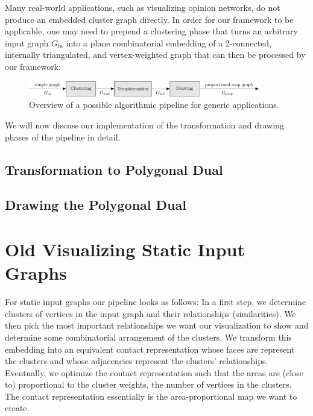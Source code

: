 Many real-world applications, such as visualizing opinion networks, do not produce an embedded cluster graph directly. In order for our framework to be applicable, one may need to prepend a clustering phase that turns an arbitrary input graph $G_\text{in}$ into a plane combinatorial embedding of a 2-connected, internally triangulated, and vertex-weighted graph that can then be processed by our framework:
%
\begin{figure}[H]
	\centering\includegraphics[width=0.9\textwidth]{Resources/StaticPipeline-Augmented.pdf}
	\caption{Overview of a possible algorithmic pipeline for generic applications.}
	\label{fig:static-pipeline-augmented}
\end{figure}

We will now discuss our implementation of the transformation and drawing phases of the pipeline in detail.

\clearpage
\section{Transformation to Polygonal Dual}
\label{sect:transformation-to-polygonal-dual}
\clearpage
\section{Drawing the Polygonal Dual}
\label{sect:drawing-the-polygonal-dual}






















\chapter{Old Visualizing Static Input Graphs}

For static input graphs our pipeline looks as follows: In a first step, we determine clusters of vertices in the input graph and their relationships (similarities). We then pick the most important relationships we want our visualization to show and determine some combinatorial arrangement of the clusters. We transform this embedding into an equivalent contact representation whose faces are represent the clusters and whose adjacencies represent the clusters' relationships. Eventually, we optimize the contact representation such that the areas are (close to) proportional to the cluster weights, \ie{} the number of vertices in the clusters. The contact representation essentially is the area-proportional map we want to create.

